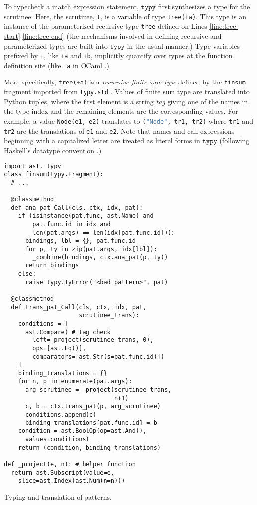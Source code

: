 \documentclass[preprint,10pt]{sigplanconf}
\newcommand{\typy}{\texttt{typy}}
\newcommand{\lip}[1]{\lstinline[language=Python,basicstyle=\ttfamily\footnotesize,deletendkeywords={tuple,buffer,map}]{#1}}
\newcommand{\li}[1]{\lip{#1}}
\begin{document}
To typecheck a match expression statement, $\typy$ first synthesizes a type for the scrutinee. Here, the scrutinee, \li{t}, is a variable of type \li{tree(+a)}. This type is an instance of the parameterized recursive type \li{tree} defined on Lines \ref{line:tree-start}-\ref{line:tree-end} (the mechanisms involved in defining recursive and parameterized types are built into $\typy$ in the usual manner.) Type variables prefixed by \li{+}, like \li{+a} and \li{+b}, implicitly quantify over types at the function definition site (like \lstinline[language=ML]{'a} in OCaml \cite{ocaml-manual}.) 

More specifically, \li{tree(+a)} is a \emph{recursive finite sum type} defined by the \li{finsum} fragment imported from \li{typy.std} \cite{pfpl}. Values of finite sum type are translated into Python tuples, where the first element is a string \emph{tag} giving one of the names in the type index and the remaining elements are the corresponding values. For example, a value \li{Node(e1, e2)} translates to \li{("Node", tr1, tr2)} where \li{tr1} and \li{tr2} are the translations of \li{e1} and \li{e2}. Note that names and call expressions beginning with a capitalized letter are treated as literal forms in $\typy$ (following Haskell's datatype convention \cite{jones2003haskell}.) 

\begin{codelisting}[t]
\vspace{-3px}
\begin{lstlisting}[deletendkeywords={slice}]
import ast, typy
class finsum(typy.Fragment):
  # ... 

  @classmethod
  def ana_pat_Call(cls, ctx, idx, pat):
    if (isinstance(pat.func, ast.Name) and 
        pat.func.id in idx and 
        len(pat.args) == len(idx[pat.func.id])):
      bindings, lbl = {}, pat.func.id
      for p, ty in zip(pat.args, idx[lbl]):
        _combine(bindings, ctx.ana_pat(p, ty))
      return bindings
    else:
      raise typy.TyError("<bad pattern>", pat)

  @classmethod
  def trans_pat_Call(cls, ctx, idx, pat, 
                     scrutinee_trans):
    conditions = [
      ast.Compare( # tag check
        left=_project(scrutinee_trans, 0),
        ops=[ast.Eq()],
        comparators=[ast.Str(s=pat.func.id)])
    ]
    binding_translations = {}
    for n, p in enumerate(pat.args):
      arg_scrutinee = _project(scrutinee_trans, 
                               n+1)
      c, b = ctx.trans_pat(p, arg_scrutinee)
      conditions.append(c)
      binding_translations[pat.func.id] = b
    condition = ast.BoolOp(op=ast.And(), 
      values=conditions)
    return (condition, binding_translations)

def _project(e, n): # helper function
  return ast.Subscript(value=e, 
    slice=ast.Index(ast.Num(n=n)))
\end{lstlisting}
\caption{Typing and translation of patterns.}
\label{fig:finsum}
\end{codelisting}
\end{document}
